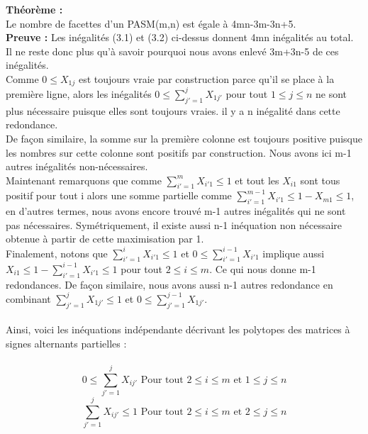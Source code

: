 \documentclass{book}
\begin{document}
\textbf{Théorème : }\\
Le nombre de facettes d'un PASM(m,n) est égale à 4mn-3m-3n+5.\\
\textbf{Preuve : }
Les inégalités (3.1) et (3.2) ci-dessus donnent 4mn inégalités au total. \\ Il ne reste donc plus qu'à savoir pourquoi nous avons enlevé 3m+3n-5 de ces inégalités. \\
Comme $0 \leqslant X_{1j}$ est toujours vraie par construction parce qu'il se place à la première ligne, alors les inégalités $0  \leqslant \sum_{j'=1}^{j} X_{1j'}$ pour tout $1 \leqslant j \leqslant n$ ne sont plus nécessaire puisque elles sont toujours vraies. il y a n inégalité dans cette redondance.\\
De façon similaire, la somme sur la première colonne est toujours positive puisque les nombres sur cette colonne sont positifs par construction. Nous avons ici m-1 autres inégalités non-nécessaires. \\
Maintenant remarquons que comme $\sum_{i'=1}^{m} X_{i'1} \leqslant 1 $ et tout les $X_{i1}$ sont tous positif pour tout i alors une somme partielle comme $\sum_{i'=1}^{m-1} X_{i'1} \leqslant 1- X_{m1} \leqslant 1$, en d'autres termes, nous avons encore trouvé m-1 autres inégalités qui ne sont pas nécessaires. Symétriquement, il existe aussi n-1 inéquation non nécessaire obtenue à partir de cette maximisation par 1.\\
Finalement, notons que $\sum_{i'=1}^{i} X_{i'1} \leqslant 1 $ et $ 0 \leqslant \sum_{i'=1}^{i-1} X_{i'1} $ implique aussi $X_{i1} \leqslant 1 - \sum_{i'=1}^{i-1} X_{i'1} \leqslant 1 $ pour tout $ 2 \leqslant i \leqslant m$. Ce qui nous donne m-1 redondances. De façon similaire, nous avons aussi n-1 autres redondance en combinant $\sum_{j'=1}^{j} X_{1j'} \leqslant 1 $ et $ 0 \leqslant \sum_{j'=1}^{j-1} X_{1j'} $.\\\\
Ainsi, voici les inéquations indépendante décrivant les polytopes des matrices à signes alternants partielles : \\\\
\begin{equation}
0 \leqslant \sum_{j'=1}^{j} X_{ij'} \text{ Pour tout } 2 \leqslant i \leqslant m \text{ et } 1 \leqslant j \leqslant n
\end{equation}
\begin{equation}
\sum_{j'=1}^{j} X_{ij'} \leqslant 1 \text{ Pour tout } 2 \leqslant i \leqslant m \text{ et } 2 \leqslant j \leqslant n
\end{equation}
\end{document}
